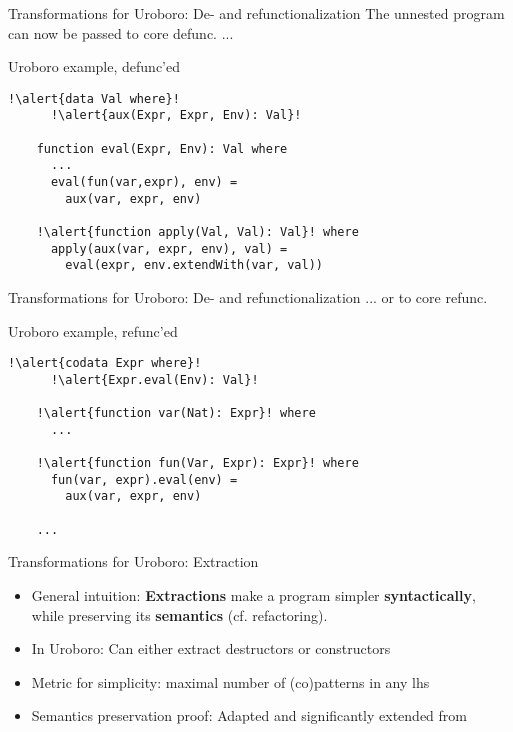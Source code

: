 \documentclass[xcolor=svgnames]{beamer}
\begin{document}
\begin{frame}[fragile]
  {Transformations for Uroboro: De- and refunctionalization}
The unnested program can now be passed to core defunc. ...

  \begin{block}{Uroboro example, defunc'ed}
    \begin{lstlisting}[escapechar=!]
    !\alert{data Val where}!
      !\alert{aux(Expr, Expr, Env): Val}!

    function eval(Expr, Env): Val where
      ...
      eval(fun(var,expr), env) =
        aux(var, expr, env)        

    !\alert{function apply(Val, Val): Val}! where
      apply(aux(var, expr, env), val) =
        eval(expr, env.extendWith(var, val))
    \end{lstlisting}
  \end{block}
\end{frame}

\begin{frame}[fragile]
  {Transformations for Uroboro: De- and refunctionalization}
... or to core refunc.

  \begin{block}{Uroboro example, refunc'ed}
    \begin{lstlisting}[escapechar=!]
    !\alert{codata Expr where}!
      !\alert{Expr.eval(Env): Val}!

    !\alert{function var(Nat): Expr}! where
      ...

    !\alert{function fun(Var, Expr): Expr}! where     
      fun(var, expr).eval(env) =
        aux(var, expr, env)

    ...
    \end{lstlisting}
  \end{block}
\end{frame}


\begin{frame}
  {Transformations for Uroboro: Extraction}

  \begin{itemize}
    \item General intuition: \textbf{Extractions} make a program simpler \textbf{syntactically}, while preserving its \textbf{semantics} (cf. refactoring).

    \item In Uroboro: Can either extract destructors or constructors

    \item Metric for simplicity: maximal number of (co)patterns in any lhs

    \item Semantics preservation proof: Adapted and significantly extended from \citet{setzer14unnesting}
  \end{itemize}

\end{frame}
\end{document}
